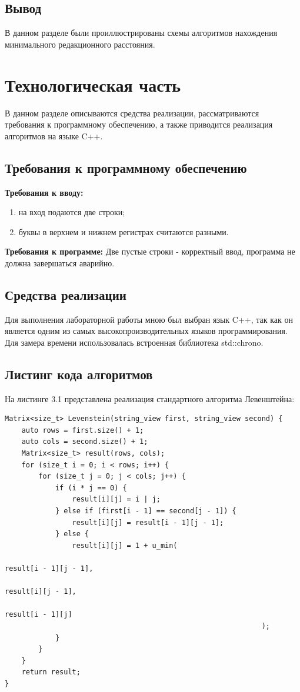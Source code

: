 \documentclass[12pt,a4paper,oneside]{report}
\begin{document}
\section*{Вывод}
\qquad В данном разделе были проиллюстрированы схемы алгоритмов нахождения минимального редакционного расстояния.


\chapter{Технологическая часть}
\qquad В данном разделе описываются средства реализации,  рассматриваются требования к программному обеспечению, а также приводится реализация алгоритмов на языке C++.
\section{Требования к программному обеспечению}
\qquad \textbf{Требования к вводу:}


\begin{enumerate}
	\item на вход подаются две строки;
	\item буквы в верхнем и нижнем регистрах считаются разными.
\end{enumerate}


\textbf{Требования к программе:}
Две пустые строки - корректный ввод, программа не должна завершаться аварийно.

\section{Средства реализации} 
\qquad Для выполнения лабораторной работы мною был выбран язык C++,  так как он является одним из самых высокопроизводительных языков программирования.
Для замера времени использовалась встроенная библиотека std::chrono\cite{timeit}. 

\newpage
\section{Листинг кода алгоритмов}
\qquad На листинге 3.1 представлена реализация стандартного алгоритма Левенштейна:
\begin{lstlisting}[label=matrix_leven,caption=Функция нахождения расстояния Левенштейна с использованием матрицы]
Matrix<size_t> Levenstein(string_view first, string_view second) {
	auto rows = first.size() + 1;
	auto cols = second.size() + 1;
	Matrix<size_t> result(rows, cols);
	for (size_t i = 0; i < rows; i++) {
		for (size_t j = 0; j < cols; j++) {
			if (i * j == 0) {
				result[i][j] = i | j;
			} else if (first[i - 1] == second[j - 1]) {
				result[i][j] = result[i - 1][j - 1];
			} else {
				result[i][j] = 1 + u_min(
																	result[i - 1][j - 1],
																	result[i][j - 1],
																	result[i - 1][j]
														     );
			}
		}
	}
	return result;
}
\end{lstlisting}
\end{document}
